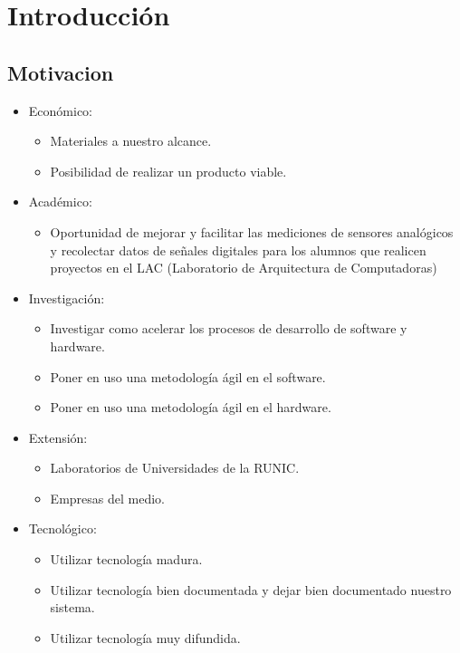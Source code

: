 \chapter{Introducción} %
\label{cha:introduccion}

\section{Motivacion} %
\label{sec:motivacion}

\begin{itemize}
	\item Económico:
	    \begin{itemize}
	        \item Materiales a nuestro alcance.
	        \item Posibilidad de realizar un producto viable.
	    \end{itemize}
	\item Académico:
	    \begin{itemize}
	        \item Oportunidad de mejorar y facilitar las mediciones de sensores analógicos y recolectar datos de señales digitales para los alumnos que realicen proyectos en el LAC (Laboratorio de Arquitectura de Computadoras)
	    \end{itemize}
	\item Investigación:
	    \begin{itemize}
	        \item Investigar como acelerar los procesos de desarrollo de software y hardware.
	        \item Poner en uso una metodología ágil en el software.
	        \item Poner en uso una metodología ágil en el hardware.
	    \end{itemize}
	\item Extensión:
	    \begin{itemize}
	        \item Laboratorios de Universidades de la RUNIC.
	        \item Empresas del medio.
	    \end{itemize}
	\item Tecnológico:
	    \begin{itemize}
	        \item Utilizar tecnología madura.
	        \item Utilizar tecnología bien documentada y dejar bien documentado nuestro sistema.
	        \item Utilizar tecnología muy difundida.
	    \end{itemize}
\end{itemize}

